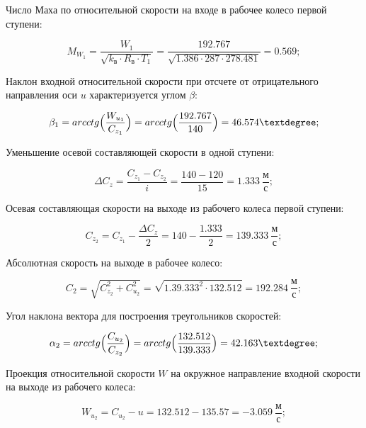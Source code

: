 Число Маха по относительной скорости на входе в рабочее колесо первой ступени:

\begin{equation} \label{eu_eqn}
	M_{W_{1}}=\dfrac{W_{1}}{\sqrt{ k_{\text{в}}\cdot R_{\text{в}}\cdot T_{1} }}= \dfrac{192.767}{\sqrt{ 1.386 \cdot 287\cdot 278.481}}=0.569;
\end{equation}

Наклон входной относительной скорости при отсчете от отрицательного направления оси $u$ характеризуется углом $\beta$:

\begin{equation} \label{eu_eqn}
	\beta_{1}=arcctg\Bigl( \dfrac{W_{u_{1}}}{C_{z_{1}}} \Bigr)=arcctg\Bigl( \dfrac{192.767}{140} \Bigr)=46.574 \textdegree;
\end{equation}

Уменьшение осевой составляющей скорости в одной ступени:

\begin{equation} \label{eu_eqn}
	\Delta C_{z}=\dfrac{{C_{z_{1}}-C_{z_{2}}}}{i}=\dfrac{140-120}{15}=1.333 \ \dfrac{\text{м}}{\text{с}};
\end{equation}

Осевая составляющая скорости на выходе из рабочего колеса первой ступени:

\begin{equation} \label{eu_eqn}
	C_{z_{2}}=C_{z_{1}}- \dfrac{\Delta C_{z}}{2}=140- \dfrac{1.333}{2}=139.333\ \dfrac{\text{м}}{\text{с}};
\end{equation}

Абсолютная скорость на выходе  в рабочее колесо:

\begin{equation} \label{eu_eqn}
	C_{2}=\sqrt{ C_{z_{2}}^2+C_{u_{2}}^2 }=\sqrt{ 1.39.333^2\cdot 132.512 }=192.284\ \dfrac{\text{м}}{\text{с}};
\end{equation}

Угол наклона вектора  для построения треугольников скоростей:

\begin{equation} \label{eu_eqn}
	\alpha_{2}=arcctg\Bigl( \dfrac{C_{u_{2}}}{C_{z_{2}}} \Bigr)=arcctg\Bigl( \dfrac{132.512}{139.333} \Bigr)=42.163 \textdegree;
\end{equation}

Проекция относительной скорости $W$ на окружное направление входной скорости на выходе из рабочего колеса:

\begin{equation} \label{eu_eqn}
	W_{u_{2}}=C_{u_{2}}-u=132.512-135.57=-3.059 \ \dfrac{\text{м}}{\text{с}};
\end{equation}

